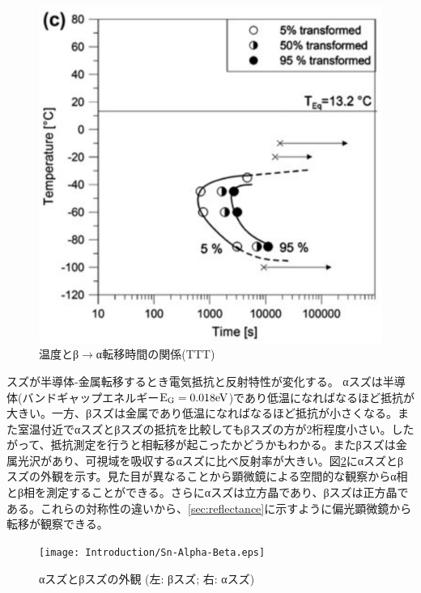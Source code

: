 \begin{figure}[!h]
\begin{minipage}{0.5\hsize}
\begin{center}
   \includegraphics[width=\hsize]{Introduction/TTT.eps}
  \end{center}
  \caption{温度とβ$\to$α転移時間の関係(TTT)}
  \label{fig:TTT}
  \end{minipage}
\end{figure}

スズが半導体-金属転移するとき電気抵抗と反射特性が変化する。
αスズは半導体(バンドギャップエネルギー$\rm E_G=0.018eV$)であり低温になればなるほど抵抗が大きい。一方、βスズは金属であり低温になればなるほど抵抗が小さくなる。また室温付近でαスズとβスズの抵抗を比較してもβスズの方が2桁程度小さい。したがって、抵抗測定を行うと相転移が起こったかどうかもわかる。またβスズは金属光沢があり、可視域を吸収するαスズに比べ反射率が大きい。図\ref{fig:Sn-Alpha-Beta}にαスズとβスズの外観を示す\cite{wiki}。見た目が異なることから顕微鏡による空間的な観察からα相とβ相を測定することができる。さらにαスズは立方晶であり、βスズは正方晶である。これらの対称性の違いから、\ref{sec:reflectance}に示すように偏光顕微鏡から転移が観察できる\cite{Matvienko}。
\begin{figure}[!h]
    \begin{center}
   \texttt{[image: Introduction/Sn-Alpha-Beta.eps]}
  \end{center}
  \caption{αスズとβスズの外観 (左: βスズ; 右: αスズ)}
  \label{fig:Sn-Alpha-Beta}
\end{figure}


